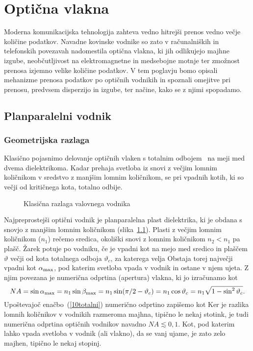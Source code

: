 
\chapter{Optična vlakna}
Moderna komunikacijska tehnologija zahteva vedno hitrejši prenos
vedno večje količine podatkov. Navadne kovinske vodnike
so zato v računalniških in telefonskih povezavah nadomestila optična 
vlakna, ki jih odlikujejo majhne izgube, neobčutljivost na elektromagnetne
in medsebojne motnje ter zmožnost prenosa izjemno velike količine podatkov. 
V tem poglavju bomo opisali mehanizme prenosa podatkov po optičnih vodnikih
in spoznali omejitve pri prenosu,
predvsem disperzijo in izgube, ter načine, kako se z njimi 
spopadamo.

\section{Planparalelni vodnik}
\subsection*{Geometrijska razlaga}
Klasično pojasnimo delovanje optičnih vlaken s totalnim odbojem~
na meji med dvema dielektrikoma. Kadar prehaja svetloba iz snovi 
z večjim lomnim količnikom v sredstvo z manjšim lomnim količnikom,
se pri vpadnih kotih, ki so večji od kritičnega kota, totalno odbije. 
\begin{figure}[h]
\centering
\def\svgwidth{110truemm} 

\caption{Klasična razlaga valovnega vodnika}
\label{fig:vodnik}
\end{figure}

Najpreprostejši optični vodnik je planparalelna plast 
dielektrika, ki je obdana s snovjo z manjšim lomnim količnikom (slika~\ref{fig:vodnik}). 
Plasti z večjim lomnim količnikom ($n_1$) rečemo sredica, 
okoliški snovi z lomnim količnikom $n_2<n_1$ pa plašč. 
Žarek potuje po vodniku, če je vpadni kot 
na mejo med sredico in plaščem $\vartheta$ večji od kota totalnega odboja $\vartheta_c$, 
za katerega velja
Obstaja torej največji vpadni kot $\alpha_{\rm max}$, pod katerim 
svetloba vpada v vodnik in ostane v njem ujeta.
Z njim povezana je numerična odprtina (apertura) vlakna, 
ki jo izračunamo kot 
\begin{equation}
NA = \sin \alpha_{\rm max} = n_1 \sin \beta_{\rm max} = 
n_1 \sin(\pi/2-\vartheta_c) =
n_1 \cos\vartheta_c = n_1 \sqrt{1-\sin^2\vartheta_c}.
\label{10NAa}
\end{equation}
Upoštevajoč enačbo~(\ref{10totalni}) numerično odprtino zapišemo kot 
Ker je razlika lomnih količnikov v vodnikih razmeroma majhna,
tipično le nekaj stotink, je tudi numerična odprtina optičnih 
vodnikov navadno
$NA \lesssim 0,1 $. Kot, pod katerim lahko vpada svetloba
v vodnik (ali vlakno), da se vanj ujame, je zato zelo majhen, tipično le nekaj stopinj.

